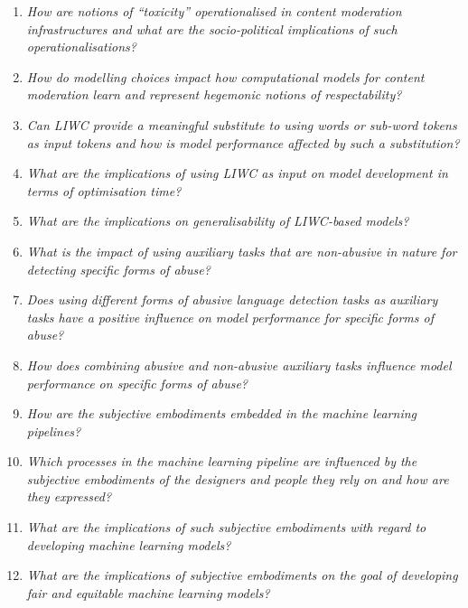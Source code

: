 \begin{center}
\begin{minipage}{0.9\textwidth}
\vspace{5mm}
    \begin{enumerate}[start=1, label={\textbf{RQ \arabic*}}]
        \item{\textit{How are notions of ``toxicity'' operationalised in content moderation infrastructures and what are the socio-political implications of such operationalisations?}}
        \item{\textit{How do modelling choices impact how computational models for content moderation learn and represent hegemonic notions of respectability?}}
        \item{\textit{Can LIWC provide a meaningful substitute to using words or sub-word tokens as input tokens and how is model performance affected by such a substitution?}}
        \item{\textit{What are the implications of using LIWC as input on model development in terms of optimisation time?}}
        \item{\textit{What are the implications on generalisability of LIWC-based models?}}
        \item{\textit{What is the impact of using auxiliary tasks that are non-abusive in nature for detecting specific forms of abuse?}}
        \item{\textit{Does using different forms of abusive language detection tasks as auxiliary tasks have a positive influence on model performance for specific forms of abuse?}}
        \item{\textit{How does combining abusive and non-abusive auxiliary tasks influence model performance on specific forms of abuse?}}
        \item{\textit{How are the subjective embodiments embedded in the machine learning pipelines?}}
        \item{\textit{Which processes in the machine learning pipeline are influenced by the subjective embodiments of the designers and people they rely on and how are they expressed?}}
        \item{\textit{What are the implications of such subjective embodiments with regard to developing machine learning models?}}
        \item{\textit{What are the implications of subjective embodiments on the goal of developing fair and equitable machine learning models?}}
    \end{enumerate}
    \vspace{5mm}
\end{minipage}
\end{center}

